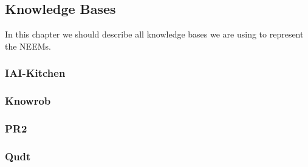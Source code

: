 \subsection{Knowledge Bases}

In this chapter we should describe all knowledge bases we are using to represent the NEEMs.

\subsubsection{IAI-Kitchen}
\subsubsection{Knowrob}
\subsubsection{PR2}
\subsubsection{Qudt}
